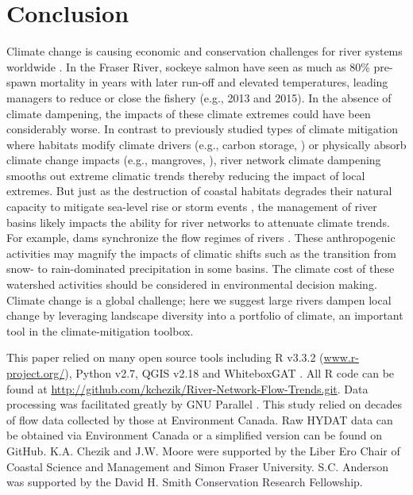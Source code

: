 \documentclass[draft,linenumbers]{AGUJournal}
\begin{document}
\section{Conclusion}

Climate change is causing economic and conservation challenges for river systems worldwide \citep{Palmer:2009,Pecl:2017}. In the Fraser River, sockeye salmon have seen as much as 80\% pre-spawn mortality in years with later run-off and elevated temperatures, leading managers to reduce or close the fishery (e.g., 2013 and 2015). In the absence of climate dampening, the impacts of these climate extremes could have been considerably worse. In contrast to previously studied types of climate mitigation where habitats modify climate drivers (e.g., carbon storage, \citep{Jones:2012}) or physically absorb climate change impacts (e.g., mangroves, \citep{Arkema:2013}), river network climate dampening smooths out extreme climatic trends thereby reducing the impact of local extremes. But just as the destruction of coastal habitats degrades their natural capacity to mitigate sea-level rise or storm events \citep{Arkema:2013}, the management of river basins likely impacts the ability for river networks to attenuate climate trends. For example, dams synchronize the flow regimes of rivers \citep{Poff:2007}. These anthropogenic activities may magnify the impacts of climatic shifts such as the transition from snow- to rain-dominated precipitation in some basins. The climate cost of these watershed activities should be considered in environmental decision making. Climate change is a global challenge; here we suggest large rivers dampen local change by leveraging landscape diversity into a portfolio of climate, an important tool in the climate-mitigation toolbox.


\acknowledgments
This paper relied on many open source tools including R v3.3.2 (\url{www.r-project.org/}), Python v2.7, QGIS v2.18 and WhiteboxGAT \citep{Lindsay:2016}. All R code can be found at \url{http://github.com/kchezik/River-Network-Flow-Trends.git}. Data processing was facilitated greatly by GNU Parallel \citep{Tange2011a}. This study relied on decades of flow data collected by those at Environment Canada. Raw HYDAT data can be obtained via Environment Canada or a simplified version can be found on GitHub. K.A. Chezik and J.W. Moore were supported by the Liber Ero Chair of Coastal Science and Management and Simon Fraser University. S.C. Anderson was supported by the David H. Smith Conservation Research Fellowship.
\end{document}
